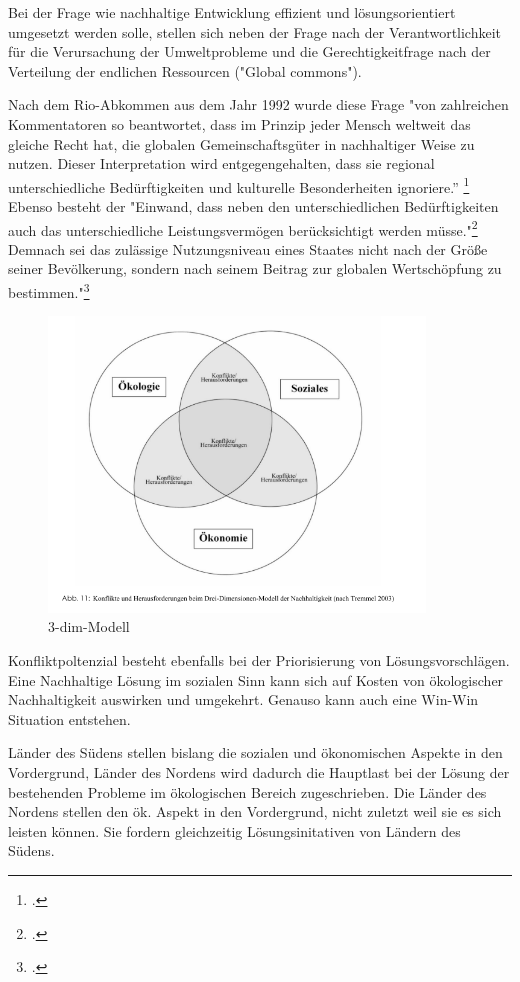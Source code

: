 \documentclass{scrartcl}
\begin{document}
Bei der Frage wie nachhaltige Entwicklung effizient und lösungsorientiert umgesetzt werden solle, stellen sich neben der Frage nach der Verantwortlichkeit für die Verursachung der Umweltprobleme und die Gerechtigkeitfrage nach der Verteilung der endlichen Ressourcen ("Global commons"). 

Nach dem Rio-Abkommen aus dem Jahr 1992 wurde diese Frage "von zahlreichen Kommentatoren so beantwortet, dass im Prinzip jeder Mensch weltweit das gleiche Recht hat, die globalen Gemeinschaftsgüter in nachhaltiger Weise zu nutzen. Dieser Interpretation wird entgegengehalten, dass sie regional unterschiedliche Bedürftigkeiten und kulturelle Besonderheiten ignoriere.” \footcite{NachhaltigeBrockhaus.de} Ebenso besteht der "Einwand, dass neben den unterschiedlichen Bedürftigkeiten auch das unterschiedliche Leistungsvermögen berücksichtigt werden müsse."\footcite{NachhaltigeBrockhaus.de} Demnach sei das zulässige Nutzungsniveau eines Staates nicht nach der Größe seiner Bevölkerung, sondern nach seinem Beitrag zur globalen Wertschöpfung zu bestimmen."\footcite{NachhaltigeBrockhaus.de}

\begin{figure}[htbp]
\centering
\includegraphics[width=10cm]{image_folder/dreidimensionenmodell_der_N.png}
\caption{3-dim-Modell}
\label{fig:3-dimensionen Modell}
\end{figure}

Konfliktpoltenzial besteht ebenfalls bei der Priorisierung von Lösungsvorschlägen. Eine Nachhaltige Lösung im sozialen Sinn kann sich auf Kosten von ökologischer Nachhaltigkeit auswirken und umgekehrt. Genauso kann auch eine Win-Win Situation entstehen.

Länder des Südens stellen bislang die sozialen und ökonomischen Aspekte in den Vordergrund, Länder des Nordens wird dadurch die Hauptlast bei der Lösung der bestehenden Probleme im ökologischen Bereich zugeschrieben. Die Länder des Nordens stellen den ök. Aspekt in den Vordergrund, nicht zuletzt weil sie es sich leisten können. Sie fordern gleichzeitig Lösungsinitativen von Ländern des Südens.
\end{document}
